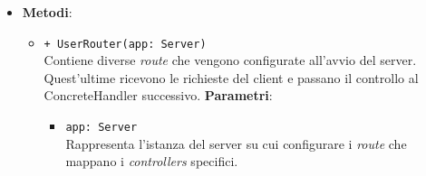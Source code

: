\begin{itemize}
\begin{itemize}
	\end{itemize}
		\item \textbf{Metodi}:
		\begin{itemize}
		\item 
		\texttt{+ UserRouter(app: Server)} \\
		Contiene diverse \textit{route} che vengono configurate all’avvio del server. Quest’ultime ricevono le richieste del client e passano il controllo al ConcreteHandler successivo.
		\textbf{Parametri}:
			\begin{itemize}
				\item 
				\texttt{app: Server} \\
				Rappresenta l’istanza del server su cui configurare i \textit{route} che mappano i \textit{controllers}  specifici.
			\end{itemize}
		\end{itemize}
\end{itemize}		